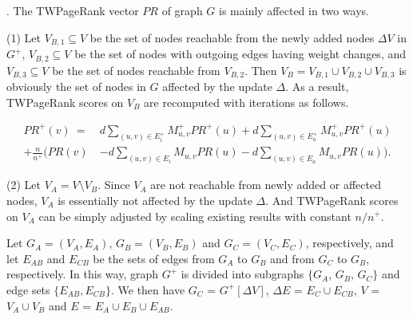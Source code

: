 

.
The TWPageRank vector $PR$ of graph $G$ is mainly affected in two ways.



\sstab(1) Let $V_{B,1}\subseteq V$ be the set of nodes reachable from the newly added nodes $\Delta V$ in $G^+$, $V_{B,2}\subseteq V$ be the set of nodes with outgoing edges having weight changes, and $V_{B,3}\subseteq V$ be the set of nodes reachable from  $V_{B,2}$.
%
Then $V_B=V_{B,1}\cup V_{B,2}\cup V_{B,3}$ is obviously the set of nodes in $G$ affected by the update $\Delta$.
%
As a result, TWPageRank scores on $V_B$ are recomputed with iterations as follows.
%
\begin{small}
\begin{equation}\label{eq-inc-prscc}
\begin{split}
PR^+(v) \ = \ &  d \sum_{(u,v)\in E^+_i} M^+_{u,v} PR^+(u) + d \sum_{(u,v)\in E^+_a} M^+_{u,v} PR^+(u)  \\
 + \frac{n}{n^+} \Big( PR(v) &  - d \sum_{(u,v)\in E_i} M_{u,v} PR(u) - d\sum_{(u,v)\in E_a} M_{u,v} PR(u)\Big).
\end{split}
\end{equation}
\vspace{-2ex}
\end{small}

\sstab(2) Let $V_A = V\setminus V_B$. Since $V_A$ are not reachable from newly added or affected nodes, $V_A$ is essentially not affected by the update $\Delta$. And TWPageRank scores on $V_A$ can be simply adjusted by scaling existing results with constant ${n}/{n^+}$.

Let $G_A=(V_A,E_A)$, $G_B=(V_B,E_B)$ and $G_C=(V_C,E_C)$, respectively, and
let $E_{AB}$ and $E_{CB}$  be the sets of edges from $G_A$ to $G_B$ and from $G_C$ to $G_B$, respectively.
In this way, graph $G^+$ is divided into subgraphs $\{G_A$, $G_B$, $G_C\}$ and edge sets $\{E_{AB}, E_{CB}\}$.
%
We then have $G_C$ = $G^+[\Delta V]$, $\Delta E$ = $E_C\cup E_{CB}$, $V$ = $V_A\cup V_B$ and $E$ = $E_A\cup E_B\cup E_{AB}$.

